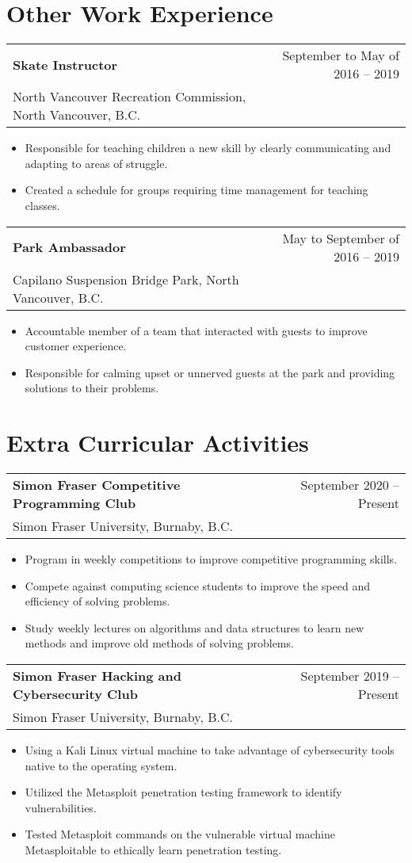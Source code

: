 \documentclass[letterpaper, 11pt]{article}
\makeatletter
\newcommand{\infoSection}[3]{
  \vspace{0pt}
    \begin{tabular*}{0.97\textwidth}[t]{l@{\extracolsep{\fill}}r}
      \textbf{#1} & {#2} \\
      {\small#3} \\
    \end{tabular*}\vspace{0pt}
    \begin{itemize}
}
\newcommand{\resumeWorkExperienceLight}[5]{
  \vspace{-1pt}
    \begin{tabular*}{0.97\textwidth}[t]{l@{\extracolsep{\fill}}r}
      \textbf{#1} & #2 \\
      \small#3 \\
    \end{tabular*}\vspace{0pt}
    \begin{itemize}
        \item #4
        \item #5
    \end{itemize}
}
\newcommand{\infoSectionEnd}{\end{itemize}}
\makeatother
\begin{document}
\section{Other Work Experience}
    \resumeWorkExperienceLight
	{Skate Instructor} {September to May of 2016 -- 2019}
	{North Vancouver Recreation Commission, North Vancouver, B.C.}
	{Responsible for teaching children a new skill by clearly communicating and adapting to areas of struggle.}
	{Created a schedule for groups requiring time management for teaching classes.}
	\vspace{10pt}
	
    \resumeWorkExperienceLight
	{Park Ambassador} {May to September of 2016 -- 2019}
	{Capilano Suspension Bridge Park, North Vancouver, B.C.}
	{Accountable member of a team that interacted with guests to improve customer experience.}
	{Responsible for calming upset or unnerved guests at the park and providing solutions to their problems.}


\section{Extra Curricular Activities}
    \infoSection
    {Simon Fraser Competitive Programming Club} {September 2020 -- Present}
    {Simon Fraser University, Burnaby, B.C.}
      \item Program in weekly competitions to improve competitive programming skills.
      \item Compete against computing science students to improve the speed and efficiency of solving problems.
      \item Study weekly lectures on algorithms and data structures to learn new methods and improve old methods of solving problems.
    \infoSectionEnd
    \vspace{10pt}
    \infoSection
    {Simon Fraser Hacking and Cybersecurity Club} {September 2019 -- Present}
    {Simon Fraser University, Burnaby, B.C.}
      \item Using a Kali Linux virtual machine to take advantage of cybersecurity tools native to the operating system.
      \item Utilized the Metasploit penetration testing framework to identify vulnerabilities.
      \item Tested Metasploit commands on the vulnerable virtual machine Metasploitable to ethically learn penetration testing.
    \infoSectionEnd
\end{document}
